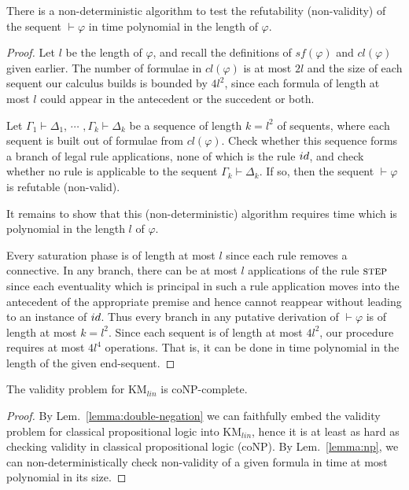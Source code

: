 \documentclass[envcountsect,envcountsame]{llncs}
\newcommand{\lcnxt}{\mathrm{KM}_{lin}}
\newcommand{\seq}{\vdash}
\newcommand{\idrulename}{\small id}
\newcommand{\steprulename}{\textsc{step}}
\begin{document}
\begin{lemma}\label{lemma:np}
There is a non-deterministic algorithm to test the
  refutability (non-validity) of the sequent
  $\seq \varphi$
  in time polynomial in the length of
  $\varphi$.
\end{lemma}
\begin{proof}
  Let
  $l$ be the length of $\varphi$, and recall the definitions of 
  $sf(\varphi)$ and
  $cl(\varphi)$ given earlier.
  The number of formulae in 
  $cl(\varphi)$ is at most $2l$ and the size of each sequent our calculus
  builds is bounded by $4l^2$, since each formula of length at most
  $l$
  could appear in the
  antecedent or the succedent or both.

  Let 
  $\Gamma_1 \seq \Delta_1$,
  $\cdots$
  $,\Gamma_{k} \seq \Delta_{k}$
  be a sequence of length $k=l^2$ of sequents,
  where each sequent is built out of formulae from
  $cl(\varphi)$. 
  Check whether this sequence forms a branch of legal rule
  applications, none of which is the rule
  $\idrulename$,
  and check whether
  no rule is applicable to the sequent
  $\Gamma_{k} \seq \Delta_{k}$.
  If so, then the sequent
  $\seq \varphi$
  is refutable (non-valid).

  It remains to show that this (non-deterministic) algorithm requires
  time which is polynomial in the length $l$ of $\varphi$.  

  Every saturation phase is of length at most $l$ since each rule removes
  a connective. In any branch, there can be at most $l$ applications of the rule
  $\steprulename$ since each eventuality which is principal in such a
  rule application moves into the antecedent of the appropriate
  premise and hence cannot reappear without leading to an instance of 
  $\idrulename$. Thus every branch in any putative derivation of 
  $\seq\varphi$ is of length at most
  $k = l^2$.
  Since each sequent is of length at most 
  $4l^2$, our procedure requires at most $4l^4$ operations.
  That is, it can be done in time polynomial in the length of the
  given end-sequent.
\end{proof}





\begin{corollary}\label{cor:conp-completeness}
  The validity problem for $\lcnxt$ is coNP-complete.
\end{corollary}
\begin{proof}
  By Lem.~\ref{lemma:double-negation} we can faithfully embed the
  validity problem for classical propositional logic into $\lcnxt$,
  hence it is at least as hard as checking validity in classical
  propositional logic (coNP). By Lem.~\ref{lemma:np}, we can
  non-deterministically check non-validity of a given formula
  in time at most polynomial in its size.
\end{proof}
\end{document}
